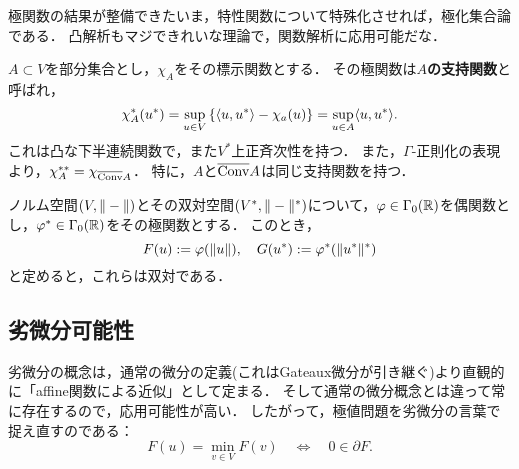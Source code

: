\documentclass[uplatex,dvipdfmx]{jsreport}
\begin{document}
\begin{tcolorbox}[colframe=ForestGreen, colback=ForestGreen!10!white,breakable,colbacktitle=ForestGreen!40!white,coltitle=black,fonttitle=\bfseries\sffamily,
title=]
    極関数の結果が整備できたいま，特性関数について特殊化させれば，極化集合論である．
    凸解析もマジできれいな理論で，関数解析に応用可能だな．
\end{tcolorbox}

\begin{example}
    $A\subset V$を部分集合とし，$\chi_A$をその標示関数とする．
    その極関数は\textbf{$A$の支持関数}と呼ばれ，
    \[\chi_A^*(u^*)=\sup_{u\in V}\left\{\langle u,u^*\rangle-\chi_a(u)\right\}=\sup_{u\in A}\langle u,u^*\rangle.\]
    これは凸な下半連続関数で，また$V^*$上正斉次性を持つ．
    また，$\Gamma$-正則化の表現より，$\chi_A^{**}=\chi_{\overline{\mathrm{Conv}}A}$．
    特に，$A$と$\overline{\mathrm{Conv}}A$は同じ支持関数を持つ．
\end{example}

\begin{example}
    ノルム空間$(V,\|-\|)$とその双対空間$(V^*,\|-\|^*)$について，$\varphi\in\Gamma_0(\mathbb{R})$を偶関数とし，$\varphi^*\in\Gamma_0(\mathbb{R})$をその極関数とする．
    このとき，
    \[F(u):=\varphi(\|u\|),\quad G(u^*):=\varphi^*(\|u^*\|^*)\]
    と定めると，これらは双対である．
\end{example}

\subsection{劣微分可能性}

\begin{tcolorbox}[colframe=ForestGreen, colback=ForestGreen!10!white,breakable,colbacktitle=ForestGreen!40!white,coltitle=black,fonttitle=\bfseries\sffamily,
title=]
    劣微分の概念は，通常の微分の定義(これはGateaux微分が引き継ぐ)より直観的に「affine関数による近似」として定まる．
    そして通常の微分概念とは違って常に存在するので，応用可能性が高い．
    したがって，極値問題を劣微分の言葉で捉え直すのである：
    \[F(u)=\min_{v\in V}F(v)\quad\Leftrightarrow\quad 0\in\partial F.\]
\end{tcolorbox}
\end{document}
